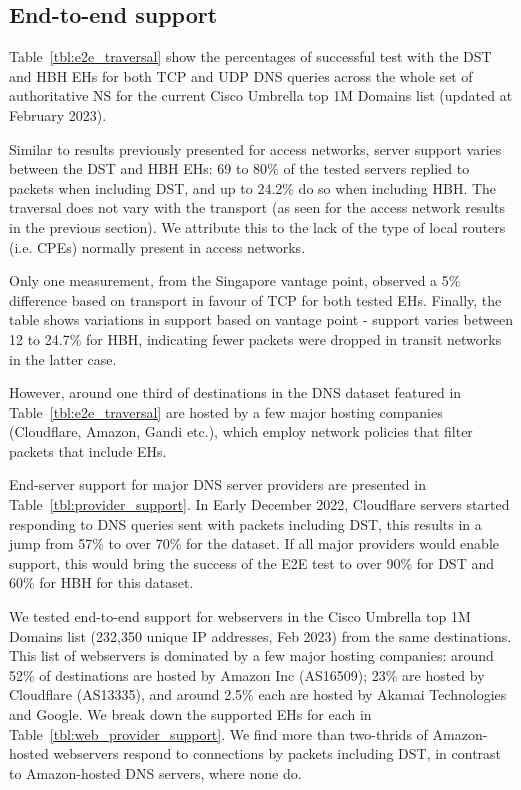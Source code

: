 \documentclass[conference]{IEEEtran}
\begin{document}
\subsection{End-to-end support}
\label{subsec:e2esupport}

Table~\ref{tbl:e2e_traversal} show the percentages of successful test with the
DST and HBH EHs for both TCP and UDP DNS queries across the whole set of
authoritative NS for the current Cisco Umbrella top 1M Domains list (updated at
February 2023).

Similar to results previously presented for access networks, server support
varies between the DST and HBH EHs: 69 to 80\% of the tested servers replied to
packets when including DST, and up to 24.2\% do so when including HBH. The
traversal does not vary with the transport (as seen for the access network
results in the previous section). We attribute this to the lack of the type of
local routers (i.e. CPEs) normally present in access networks. 

Only one measurement, from the Singapore vantage point, observed a 5\% difference based on transport in favour of TCP for both tested EHs.
Finally, the table shows variations in support based on vantage point - support varies between 12 to 24.7\% for HBH, indicating fewer packets were dropped in transit networks in the latter case.

However, around one third of destinations in the DNS dataset featured in Table~\ref{tbl:e2e_traversal} are hosted by a few major hosting companies (Cloudflare, Amazon, Gandi etc.), which employ network policies that filter packets that include EHs. 

End-server support for major DNS server providers are presented in Table~\ref{tbl:provider_support}. In Early December 2022, Cloudflare servers started responding to DNS queries sent with packets including DST, this results in a jump from 57\% to over 70\% for the dataset. If all major providers would enable support, this would bring the success of the E2E test to over 90\% for DST and 60\% for HBH for this dataset.

We tested end-to-end support for webservers in the Cisco Umbrella top 1M Domains list (232,350 unique IP addresses, Feb 2023) from the same destinations. This list of webservers is dominated by a few major hosting companies: around 52\% of destinations are hosted by Amazon Inc (AS16509); 23\% are hosted by Cloudflare (AS13335), and around 2.5\% each are hosted by Akamai Technologies and Google. We break down the supported EHs for each in Table~\ref{tbl:web_provider_support}. We find more than two-thrids of Amazon-hosted webservers respond to connections by packets including DST, in contrast to Amazon-hosted DNS servers, where none do. 
\end{document}
